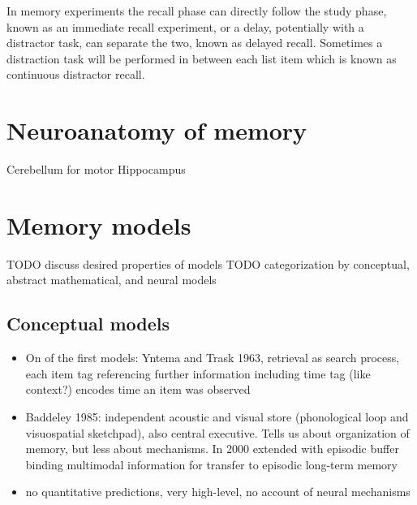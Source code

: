 In memory experiments the recall phase can directly follow the study phase, known as an immediate recall experiment, or a delay, potentially with a distractor task, can separate the two, known as delayed recall.
Sometimes a distraction task will be performed in between each list item which is known as continuous distractor recall.


\section{Neuroanatomy of memory}
Cerebellum for motor
Hippocampus


\section{Memory models}
TODO discuss desired properties of models
TODO categorization by conceptual, abstract mathematical, and neural models

\subsection{Conceptual models}
\begin{itemize}
    \item On of the first models: Yntema and Trask 1963, retrieval as search process, each item tag referencing further information including time tag (like context?) encodes time an item was observed
    \item Baddeley 1985: independent acoustic and visual store (phonological loop and visuospatial sketchpad), also central executive. Tells us about organization of memory, but less about mechanisms. In 2000 extended with episodic buffer binding multimodal information for transfer to episodic long-term memory
    \item no quantitative predictions, very high-level, no account of neural mechanisms
\end{itemize}

